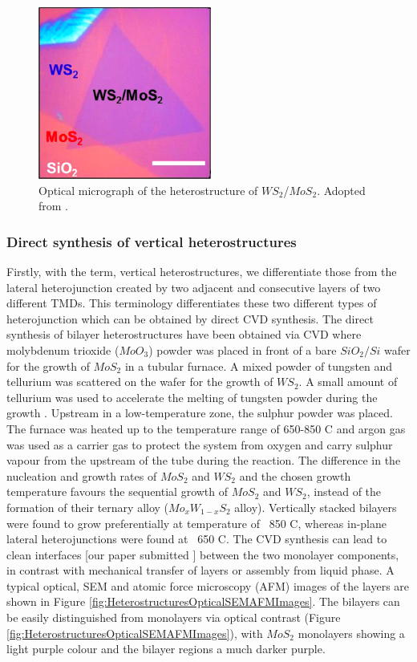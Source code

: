 \begin{figure}[H]
	\begin{center}
		\includegraphics[scale=1]{Heterostructures/HeterostructureOpticalMap.png}
		\caption{Optical micrograph of the heterostructure of $WS_2$/$MoS_2$. Adopted from \cite{Tongay2014}.}
		\label{fig:HeterostructuresOpticalMap}
	\end{center}
\end{figure}

\subsubsection{Direct synthesis of vertical heterostructures}

Firstly, with the term, vertical heterostructures, we differentiate those from the lateral heterojunction created by two adjacent and consecutive layers of two different TMDs.
This terminology differentiates these two different types of heterojunction which can be obtained by direct CVD synthesis.
The direct synthesis of bilayer heterostructures have been obtained via CVD where molybdenum trioxide ($MoO_3$) powder was placed in  front of a bare $SiO_2/Si$ wafer for the growth of $MoS_2$ in a tubular furnace. A mixed powder of tungsten and tellurium was scattered on the wafer for the growth of $WS_2$. A small amount of tellurium was used to accelerate the melting of tungsten powder during the growth \cite{Gong2014}. Upstream in a low-temperature zone, the sulphur powder was placed. The furnace was heated up to the temperature range of 650-850 {\degree}C and argon gas was used as a carrier gas to protect the system from oxygen and carry sulphur vapour from the upstream of the tube during the reaction. The difference in the nucleation and growth rates of $MoS_2$ and $WS_2$ and the chosen growth temperature favours the sequential growth of $MoS_2$ and $WS_2$, instead of  the formation of their ternary alloy ($Mo_xW_{1-x}S_2$ alloy). Vertically stacked bilayers were found to grow preferentially at temperature of ~850 {\degree}C, whereas in-plane lateral heterojunctions were found at ~650 {\degree}C. The CVD  synthesis can lead to clean interfaces \cite{Gong2014}[our paper submitted ] between the two monolayer components, in contrast with mechanical transfer of layers or assembly from liquid phase. A typical optical, SEM and atomic force microscopy (AFM) images of the layers are shown in Figure \ref{fig:HeterostructuresOpticalSEMAFMImages}. The bilayers can be easily distinguished from monolayers via optical contrast (Figure \ref{fig:HeterostructuresOpticalSEMAFMImages}), with $MoS_2$ monolayers showing a light purple colour and the bilayer regions a much darker purple.

